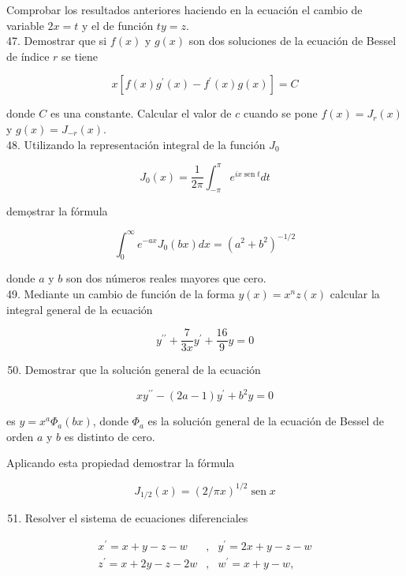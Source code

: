 \documentclass[10pt]{article}
\theoremstyle{plain}
\theoremstyle{definition}
\theoremstyle{remark}
\begin{document}
Comprobar los resultados anteriores haciendo en la ecuación el cambio de variable $2 x=t$ y el de función $t y=z$.\\
47. Demostrar que si $f(x)$ y $g(x)$ son dos soluciones de la ecuación de Bessel de índice $r$ se tiene

$$
x\left[f(x) g^{\prime}(x)-f^{\prime}(x) g(x)\right]=C
$$

donde $C$ es una constante. Calcular el valor de $c$ cuando se pone $f(x)=J_{r}(x)$ y $g(x)=J_{-r}(x)$.\\
48. Utilizando la representación integral de la función $J_{0}$

$$
J_{0}(x)=\frac{1}{2 \pi} \int_{-\pi}^{\pi} e^{i x \operatorname{sen} t} d t
$$

demọstrar la fórmula

$$
\int_{0}^{\infty} e^{-a x} J_{0}(b x) d x=\left(a^{2}+b^{2}\right)^{-1 / 2}
$$

donde $a$ y $b$ son dos números reales mayores que cero.\\
49. Mediante un cambio de función de la forma $y(x)=x^{n} z(x)$ calcular la integral general de la ecuación

$$
y^{\prime \prime}+\frac{7}{3 x} y^{\prime}+\frac{16}{9} y=0
$$

\begin{enumerate}
  \setcounter{enumi}{49}
  \item Demostrar que la solución general de la ecuación
\end{enumerate}

$$
x y^{\prime \prime}-(2 a-1) y^{\prime}+b^{2} y=0
$$

es $y=x^{a} \Phi_{a}(b x)$, donde $\Phi_{a}$ es la solución general de la ecuación de Bessel de orden $a$ y $b$ es distinto de cero.

Aplicando esta propiedad demostrar la fórmula

$$
J_{1 / 2}(x)=(2 / \pi x)^{1 / 2} \operatorname{sen} x
$$

\begin{enumerate}
  \setcounter{enumi}{50}
  \item Resolver el sistema de ecuaciones diferenciales
\end{enumerate}

$$
\begin{array}{lll}
x^{\prime}=x+y-z-w & , & y^{\prime}=2 x+y-z-w \\
z^{\prime}=x+2 y-z-2 w & , & w^{\prime}=x+y-w,
\end{array}
$$
\end{document}
